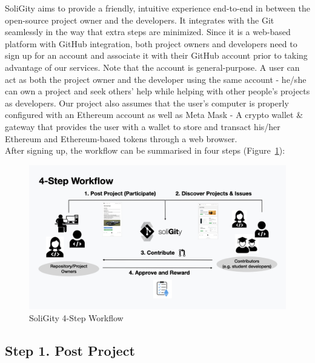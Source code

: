 \documentclass[12pt]{article}
\renewcommand{\_}{\kern-1.5pt\textunderscore\kern-1.5pt}
\begin{document}
SoliGity aims to provide a friendly, intuitive experience end-to-end in between the open-source project owner and the developers. It integrates with the Git seamlessly in the way that extra steps are minimized. Since it is a web-based platform with GitHub integration, both project owners and developers need to sign up for an account and associate it with their GitHub account prior to taking advantage of our services. Note that the account is general-purpose. A user can act as both the project owner and the developer using the same account - he/she can own a project and seek others’ help while helping with other people’s projects as developers. Our project also assumes that the user’s computer is properly configured with an Ethereum account as well as Meta Mask - A crypto wallet \& gateway that provides the user with a wallet to store and transact his/her Ethereum and Ethereum-based tokens through a web browser. \\

\noindent After signing up, the workflow can be summarised in four steps (Figure~\ref{fig:workflow1}):

\begin{figure}[H]
	\centering
	\includegraphics[width=16.5cm]{graphs/00a. workflow.jpeg}
	\caption{SoliGity 4-Step Workflow}
	\label{fig:workflow1}
\end{figure}


\subsection*{Step 1. Post Project}
\end{document}
